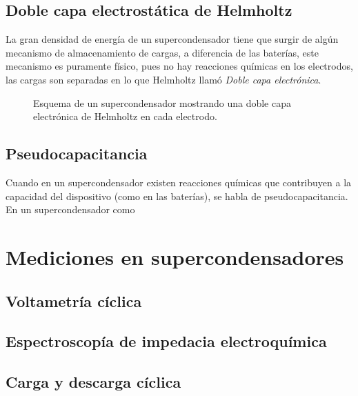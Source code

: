 \subsection{Doble capa electrostática de Helmholtz}
La gran densidad de energía de un supercondensador tiene que surgir de algún mecanismo de almacenamiento de cargas, a diferencia de las baterías, este mecanismo es puramente físico, pues no hay reacciones químicas en los electrodos, las cargas son separadas en lo que Helmholtz llamó \textit{Doble capa electrónica}.\citep{Frackowiak2001}

\begin{figure}[h!]
	\centering
	\caption{Esquema de un supercondensador mostrando una doble capa electrónica de Helmholtz en cada electrodo.}
	\label{fig:edlc}
\end{figure}

\subsection{Pseudocapacitancia}
Cuando en un supercondensador existen reacciones químicas que contribuyen a la capacidad del dispositivo (como en las baterías), se habla de pseudocapacitancia. En un supercondensador como

\section{Mediciones en supercondensadores}
\subsection{Voltametría cíclica}
\subsection{Espectroscopía de impedacia electroquímica}
\subsection{Carga y descarga cíclica}